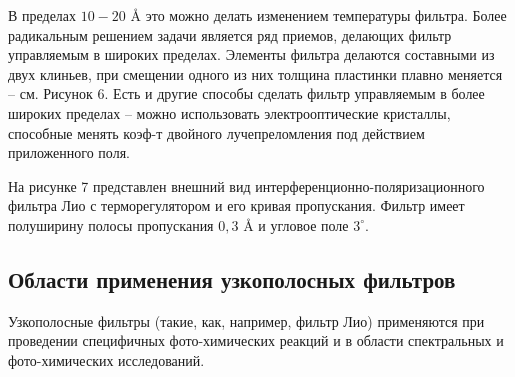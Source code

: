В пределах $ 10 - 20 $ \AA \hspace{0.1cm} это можно делать изменением температуры фильтра. Более
радикальным решением задачи является ряд приемов, делающих фильтр управляемым в
широких пределах. Элементы фильтра делаются составными из двух клиньев, при смещении
одного из них толщина пластинки плавно меняется -- см. Рисунок 6. Есть и другие способы
сделать фильтр управляемым в более широких пределах -- можно использовать
электрооптические кристаллы, способные менять коэф-т двойного лучепреломления под
действием приложенного поля.


На рисунке 7 представлен внешний вид интерференционно-поляризационного фильтра Лио с
терморегулятором и его кривая пропускания. Фильтр имеет полуширину полосы пропускания
$ 0,3 $ \AA \hspace{0.1cm} и угловое поле $ 3^\circ $.


\subsection{Области применения узкополосных фильтров}

Узкополосные фильтры (такие, как, например, фильтр Лио) применяются при проведении
специфичных фото-химических реакций и в области спектральных и фото-химических
исследований.
